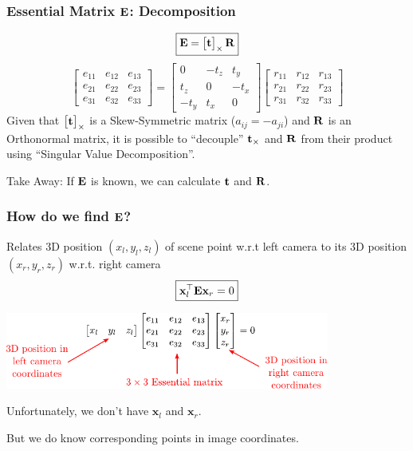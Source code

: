 \begin{frame}
    \frametitle{Essential Matrix $\boldsymbol{\mathbf{E}}$: Decomposition}
    $$
    \boxed{\boldsymbol{\mathbf{E}} = \begin{bmatrix}\boldsymbol{\mathbf{t}}\end{bmatrix}_{\times} \boldsymbol{\mathbf{R}}}
    $$
    $$
    \begin{bmatrix}
        e_{11} & e_{12} & e_{13} \\
        e_{21} & e_{22} & e_{23} \\
        e_{31} & e_{32} & e_{33}
    \end{bmatrix} =
    \begin{bmatrix}
        0 & -t_z & t_y \\
        t_z & 0 & -t_x \\
        -t_y & t_x & 0
    \end{bmatrix}
    \begin{bmatrix}
        r_{11} & r_{12} & r_{13} \\
        r_{21} & r_{22} & r_{23} \\
        r_{31} & r_{32} & r_{33}
    \end{bmatrix}
    $$
    Given that $\begin{bmatrix}\boldsymbol{\mathbf{t}}\end{bmatrix}_{\times}$ is a Skew-Symmetric matrix ($a_{ij} = -a_{ji}$) and $\boldsymbol{\mathbf{R}}$ is an Orthonormal matrix, it is possible to ``decouple'' $\boldsymbol{\mathbf{t}}_{\times}$ and $\boldsymbol{\mathbf{R}}$ from their product using ``Singular Value Decomposition''.

    \vspace{0.5cm}
    Take Away: If $\boldsymbol{\mathbf{E}}$ is known, we can calculate $\boldsymbol{\mathbf{t}}$ and $\boldsymbol{\mathbf{R}}$.
\end{frame}




\begin{frame}
    \frametitle{How do we find $\boldsymbol{\mathbf{E}}$?}
    Relates 3D position $(x_l, y_l, z_l)$ of scene point w.r.t left camera to its 3D position $(x_r, y_r, z_r)$ w.r.t. right camera
    \begin{equation*}
        \boxed{\mathbf{x}_l^{\top} \boldsymbol{\mathbf{E}} \mathbf{x}_r = 0}
    \end{equation*}

    \begin{center}
        \includegraphics[width=0.8\textwidth]{./images/essential_matrix_coplanary_constraint.pdf}
    \end{center}

    Unfortunately, we don't have $\mathbf{x}_l$ and $\mathbf{x}_r$.

    But we do know corresponding points in image coordinates.
\end{frame}

